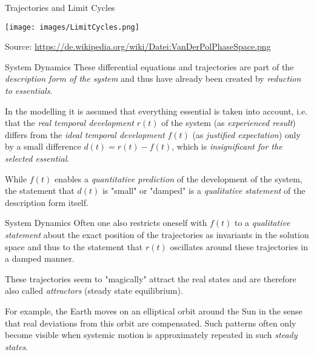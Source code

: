 \documentclass{beamer}
\begin{document}
\begin{frame}{Trajectories and Limit Cycles}

  \begin{center}
    \texttt{[image: images/LimitCycles.png]}

    \footnotesize
    Source: \url{https://de.wikipedia.org/wiki/Datei:VanDerPolPhaseSpace.png}
  \end{center}
  
\end{frame}

\begin{frame}{System Dynamics}
These differential equations and trajectories are part of the
\emph{description form of the system} and thus have already been created by
\emph{reduction to essentials}.

In the modelling it is assumed that everything essential is taken into
account, i.e. that the \emph{real temporal development} $r(t)$ of the system
(as \emph{experienced result}) differs from the \emph{ideal temporal
  development} $f(t)$ (as \emph{justified expectation}) only by a small
difference $d(t)=r(t)-f(t)$, which is \emph{insignificant for the selected
  essential}.

While $f(t)$ enables a \emph{quantitative prediction} of the development of
the system, the statement that $d(t)$ is "small" or "damped" is a
\emph{qualitative statement} of the description form itself.

\end{frame}

\begin{frame}{System Dynamics}
Often one also restricts oneself with $f(t)$ to a \emph{qualitative statement}
about the exact position of the trajectories as invariants in the solution
space and thus to the statement that $r(t)$ oscillates around these
trajectories in a damped manner.

These trajectories seem to "magically" attract the real states and are
therefore also called \emph{attractors} (steady state equilibrium).

For example, the Earth moves on an elliptical orbit around the Sun in the
sense that real deviations from this orbit are compensated.  Such patterns
often only become visible when systemic motion is approximately repeated in
such \emph{steady states}.
\end{frame}
\end{document}
